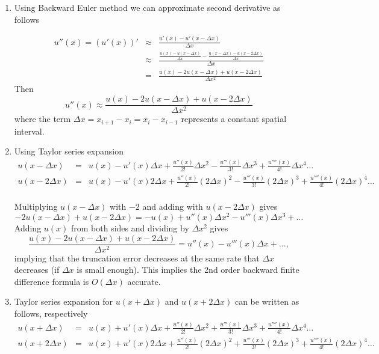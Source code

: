 \begin{solution}
\begin{enumerate}

\item Using Backward Euler method we can approximate second derivative as follows

\begin{eqnarray*}
u''(x)=(u'(x))'&\approx& \frac{ u'(x)-u'(x-\Delta x)}{\Delta x}\\
&\approx& \frac{\frac{ u(x)-u(x-\Delta x)}{\Delta x}-\frac{ u(x-\Delta x)-u(x-2 \Delta x)}{\Delta x}}{\Delta x}\\
&=& \frac{ u(x)-2 u(x-\Delta x) + u(x-2 \Delta x)}{\Delta x^2}
\end{eqnarray*} 
Then 
\[ u''(x) \approx \frac{ u(x)-2 u(x-\Delta x) + u(x-2 \Delta x)}{\Delta x^2}
\]
where the term $\Delta x = x_{i+1}-x_{i}= x_{i}-x_{i-1}$ represents a constant spatial interval.
\\
\item Using Taylor series expansion
\begin{eqnarray*}
u(x-\Delta x) &=& u(x) - u'(x)\Delta x + \frac{u''(x)}{2!}\Delta x^2 - \frac{u'''(x)}{3!}\Delta x^3 + \frac{u''''(x)}{4!}\Delta x^4  \ldots\\
u(x-2\Delta x) &=& u(x) - u'(x) 2\Delta x + \frac{u''(x)}{2!} (2\Delta x)^2 - \frac{u'''(x)}{3!} (2\Delta x)^3 + \frac{u''''(x)}{4!}(2\Delta x)^4  \ldots\\
\end{eqnarray*}

Multiplying $u(x-\Delta x) $ with $-2$ and adding with $u(x-2\Delta x)$ gives
\[
-2 u(x-\Delta x) + u(x-2\Delta x) = -u(x) + u''(x)\Delta x^2 -u'''(x)\Delta x^3 + \ldots
\]
Adding $u(x)$ from both sides and dividing by $\Delta x^2$ gives
\[
\frac{u(x) -2u(x -\Delta x) + u(x-2 \Delta x)}{\Delta x^2} = u''(x) - u'''(x)\Delta x + \ldots,
\]
implying that the truncation error decreases at the same rate that $\Delta x$ decreases (if $\Delta x$ is small enough).  This implies the 2nd order backward finite difference formula is $O(\Delta x)$ accurate. 
\\
\item Taylor series expansion for  $u(x+\Delta x)$ and $u(x +2\Delta x)$ can be written  as follows, respectively
\begin{eqnarray*}
u(x + \Delta x) &=& u(x) + u'(x)\Delta x + \frac{u''(x)}{2!}\Delta x^2 + \frac{u'''(x)}{3!}\Delta x^3 + \frac{u''''(x)}{4!}\Delta x^4  \ldots\\
u(x + 2\Delta x) &=& u(x) + u'(x) 2\Delta x + \frac{u''(x)}{2!} (2\Delta x)^2 + \frac{u'''(x)}{3!} (2\Delta x)^3 + \frac{u''''(x)}{4!}(2\Delta x)^4  \ldots
\end{eqnarray*}


\end{enumerate}
\end{solution}
